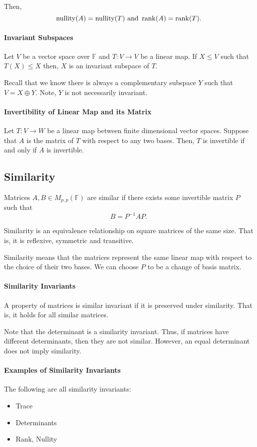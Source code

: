 Then, \[
    \mathrm{nullity}(A) = \mathrm{nullity}(T) \text{ and } \rank(A) = \rank(T)
.\]

\paragraph{Invariant Subspaces}
Let \(V\) be a vector space over \( \mathbb{F} \) and \(T: V\to V\)
be a linear map.
If \(X \leq V\) such that \(T(X) \leq X\) then, \(X\) is an invariant
subspace of \(T\).

Recall that we know there is always a complementary subspace \(Y\)
such that \(V = X \oplus Y\).
Note, \(Y\) is not necessarily invariant.

\paragraph{Invertibility of Linear Map and its Matrix}
Let \( T: V \to W \) be a linear map between finite dimensional vector spaces.
Suppose that \( A \) is the matrix of \( T \) with respect to any two bases.
Then, \( T \) is invertible if and only if \( A \) is invertible.

\subsection{Similarity}

Matrices \( A, B \in M_{p, p}(\mathbb{F}) \) are similar if there exists
some invertible matrix \( P \) such that \[
    B = P^{-1} A P.
\]

Similarity is an equivalence relationship on square matrices of the same size.
That is, it is reflexive, symmetric and transitive.

Similarity means that the matrices represent the same linear map with
respect to the choice of their two bases.
We can choose \( P \) to be a change of basis matrix.

\paragraph{Similarity Invariants}
A property of matrices is similar invariant if it is preserved under similarity.
That is, it holds for all similar matrices.

Note that the determinant is a similarity invariant. Thus, if matrices
have different determinants, then they are not similar.
However, an equal determinant does not imply similarity.


\paragraph{Examples of Similarity Invariants}
The following are all similarity invariants:
\begin{itemize}
    \item Trace
    \item Determinants
    \item Rank, Nullity
\end{itemize}


